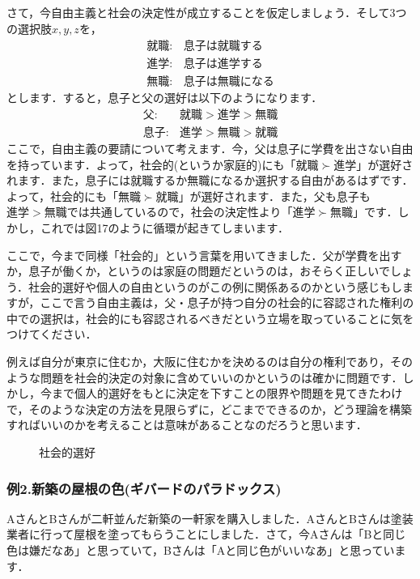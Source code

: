 さて，今自由主義と社会の決定性が成立することを仮定しましょう．そして3つの選択肢$x,y,z$を，
\begin{align*}
    就職 : & 息子は就職する \\
    進学 : & 息子は進学する \\
    無職 : & 息子は無職になる
\end{align*}
とします．すると，息子と父の選好は以下のようになります．
\begin{align*}
    父   :& 就職 > 進学 > 無職 \\
    息子 :& 進学 > 無職 > 就職 
\end{align*}
ここで，自由主義の要請について考えます．今，父は息子に学費を出さない自由を持っています．よって，社会的(というか家庭的)にも「$就職 \succ 進学$」が選好されます．また，息子には就職するか無職になるか選択する自由があるはずです．よって，社会的にも「$無職 \succ 就職$」が選好されます．また，父も息子も$進学 > 無職$では共通しているので，社会の決定性より「$進学 \succ 無職$」です．しかし，これでは図17のように循環が起きてしまいます．

ここで，今まで同様「社会的」という言葉を用いてきました．父が学費を出すか，息子が働くか，というのは家庭の問題だというのは，おそらく正しいでしょう．社会的選好や個人の自由というのがこの例に関係あるのかという感じもしますが，ここで言う自由主義は，父・息子が持つ自分の社会的に容認された権利の中での選択は，社会的にも容認されるべきだという立場を取っていることに気をつけてください．

例えば自分が東京に住むか，大阪に住むかを決めるのは自分の権利であり，そのような問題を社会的決定の対象に含めていいのかというのは確かに問題です．しかし，今まで個人的選好をもとに決定を下すことの限界や問題を見てきたわけで，そのような決定の方法を見限らずに，どこまでできるのか，どう理論を構築すればいいのかを考えることは意味があることなのだろうと思います．

\begin{figure}[!h]
    \label{fig:17}
    \centering
    \caption{社会的選好}
\end{figure}

\subsubsection*{例2.新築の屋根の色(ギバードのパラドックス)}
AさんとBさんが二軒並んだ新築の一軒家を購入しました．AさんとBさんは塗装業者に行って屋根を塗ってもらうことにしました．さて，今Aさんは「Bと同じ色は嫌だなあ」と思っていて，Bさんは「Aと同じ色がいいなあ」と思っています．

